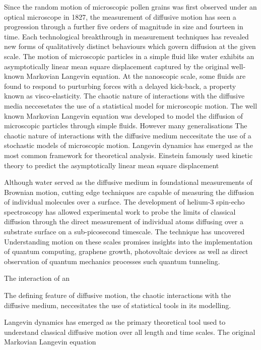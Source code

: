 \documentclass[7pt]{article}
\begin{document}
Since the random motion of microscopic pollen grains was first observed under an optical microscope in 1827, the measurement of diffusive motion has seen a progression through a further five orders of magnitude in size and fourteen in time\cite{Jardine200911}. Each technological breakthrough in measurement techniques has revealed new forms of qualitatively distinct behaviours which govern diffusion at the given scale. The motion of microscopic particles in a simple fluid like water exhibits an asymptotically linear mean square displacement captured by the original well-known Markovian Langevin equation. At the nanoscopic scale, some fluids are found to respond to purturbing forces with a delayed kick-back, a property known as visco-elasticity. The chaotic nature of interactions with the diffusive media neccesetates the use of a statistical model for microscopic motion. The well known Markovian Langevin equation was developed to model the diffusion of microscopic particles through simple fluids. However many generalisations The chaotic nature of interactions with the diffusive medium neccesitate the use of a stochastic models of microscopic motion. Langevin dynamics has emerged as the most common framework for theoretical analysis. Einstein famously used kinetic theory to predict the asymptotically linear mean square displacement  

Although water served as the diffusive medium in foundational measurements of Brownian motion, cutting edge techniques are capable of measuring the diffusion of individual  molecules over a surface\cite{Tamtgl2020}. The development of helium-3 spin-echo spectroscopy has allowed experimental work to probe the limits of classical diffusion through the direct measurement of individual atoms diffusing over a substrate surface on a sub-picosecond timescale. The technique has uncovered  Understanding motion on these scales promises insights into the implementation of quantum computing\cite{Jardine2009}, graphene growth\cite{Tamtgl2015}, photovoltaic devices\cite{Sacchi} as well as direct observation of quantum mechanics processes such quantum tunneling\cite{McIntosh2013}. 

The interaction of an  

The defining feature of diffusive motion, the chaotic interactions with the diffusive medium, neccesitates the use of statistical tools in its modelling.

Langevin dynamics has emerged as the primary theoretical tool used to understand classical diffusive motion over all length and time scales. The original Markovian Langevin equation  
\end{document}
